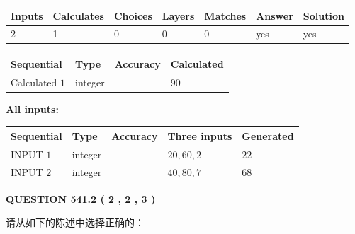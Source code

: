 \documentclass{ctexart}
\begin{document}
 
\noindent{}
 
 

 
   
   
   
   
\noindent\begin{tabular}{|l|l|l|l|l|l|l|}
 \hline
Inputs & Calculates & Choices & Layers & Matches & Answer & Solution \\ \hline
 2  & 
 1  & 
 0
  & 
 0  & 
 0  & 
  yes & 
  yes 
  \\ \hline
 \end{tabular}
   
   
   
   
\noindent{}
   
   
  
  
\noindent\begin{tabular}{|l|l|l|l|}
\hline
 Sequential & Type & Accuracy & Calculated \\ 
\hline
 
 
  Calculated $  1 $ & integer &  & 
  $ 90 $ 
 \\  \hline  
 \end{tabular}
   
   
   
   
\noindent\vspace{0.1in}\hspace{-0.08in} {\textbf{\Large{All inputs: }}}
   
   
  
  
\noindent\begin{tabular}{|l|l|l|l|l|}
\hline
 Sequential & Type & Accuracy & Three inputs & Generated \\ 
\hline
 
 
  INPUT $  1 $ & integer &  & $
 20
 , 
 60
 , 
 2
 $ & $ 22 $ 
 \\  \hline  
 
 
  INPUT $  2 $ & integer &  & $
 40
 , 
 80
 , 
 7
 $ & $ 68 $ 
 \\  \hline  
 \end{tabular}
   
   
  
\vspace{0.2in}
  
{\textbf{\Large{QUESTION
541.2 
 ( 2 , 2 , 3 )
}}}
  
  
请从如下的陈述中选择正确的：
 
\end{document}
